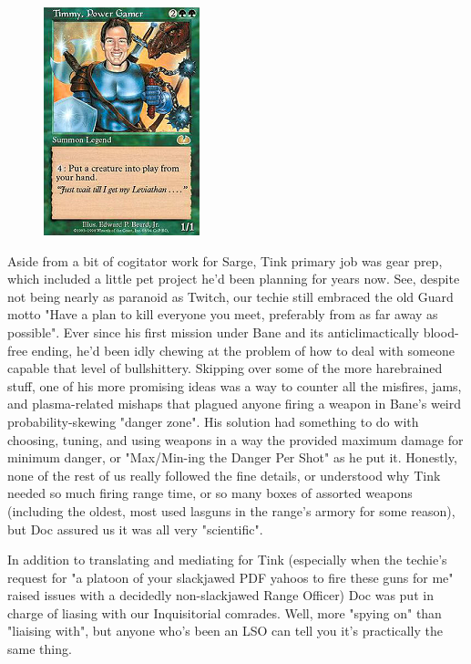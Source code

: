 \begin{figure}
	\begin{center}
		\includegraphics[width=\figwidth]{pics/19/27.png}
	\end{center}
\end{figure}
Aside from a bit of cogitator work for Sarge, Tink primary job was gear prep, which included a little pet project he'd been planning for years now. 
See, despite not being nearly as paranoid as Twitch, our techie still embraced the old Guard motto "Have a plan to kill everyone you meet, preferably from as far away as possible". 
Ever since his first mission under Bane and its anticlimactically blood-free ending, he'd been idly chewing at the problem of how to deal with someone capable that level of bullshittery. 
Skipping over some of the more harebrained stuff, one of his more promising ideas was a way to counter all the misfires, jams, and plasma-related mishaps that plagued anyone firing a weapon in Bane's weird probability-skewing "danger zone". 
His solution had something to do with choosing, tuning, and using weapons in a way the provided maximum damage for minimum danger, or "Max/Min-ing the Danger Per Shot" as he put it. 
Honestly, none of the rest of us really followed the fine details, or understood why Tink needed so much firing range time, or so many boxes of assorted weapons (including the oldest, most used lasguns in the range's armory for some reason), but Doc assured us it was all very "scientific".

In addition to translating and mediating for Tink (especially when the techie's request for "a platoon of your slackjawed PDF yahoos to fire these guns for me" raised issues with a decidedly non-slackjawed Range Officer) Doc was put in charge of liasing with our Inquisitorial comrades. 
Well, more "spying on" than "liaising with", but anyone who's been an LSO can tell you it's practically the same thing. 


